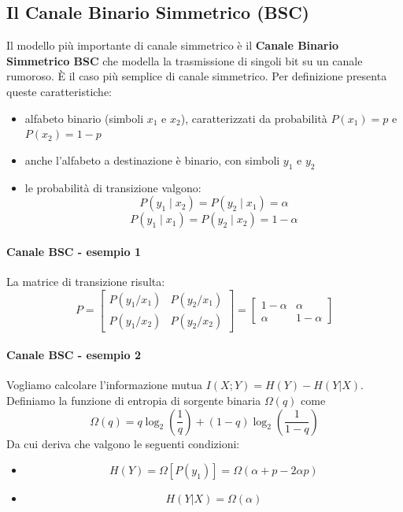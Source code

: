 \subsection{Il Canale Binario Simmetrico (BSC)}
Il modello più importante di canale simmetrico è il \textbf{Canale Binario Simmetrico BSC} che modella la trasmissione di singoli bit su un canale rumoroso. È il caso più semplice di canale simmetrico.
Per definizione presenta queste caratteristiche:
\begin{itemize}
    \item alfabeto binario (simboli $x_1$ e $x_2$), caratterizzati da probabilità $P(x_1)= p$ e $P(x_2)= 1-p$
    \item anche l'alfabeto a destinazione è binario, con simboli $y_1$ e $y_2$
    \item le probabilità di transizione valgono:
    \[P(y_1\mid x_2) = P(y_2 \mid x_1) = \alpha\]
    \[P(y_1\mid x_1) = P(y_2 \mid x_2) = 1- \alpha\]
\end{itemize}

\paragraph{Canale BSC - esempio 1}
%


La matrice di transizione risulta:
\[
P = \begin{bmatrix}
P(y_1/x_1) & P(y_2/x_1) \\
P(y_1/x_2) & P(y_2/x_2)
\end{bmatrix} =
\begin{bmatrix}
1-\alpha & \alpha \\
\alpha & 1-\alpha
\end{bmatrix}
\]


\paragraph{Canale BSC - esempio 2}
Vogliamo calcolare l'informazione mutua $I(X;Y) = H(Y) - H(Y|X)$.
Definiamo la funzione di entropia di sorgente binaria $\Omega(q)$ come
\[\Omega(q) = q\log_2\left(\frac{1}{q}\right) + (1 - q) \log_2 \left(\frac{1}{1-q}\right)\]
Da cui deriva che valgono le seguenti condizioni:
\begin{itemize}
    \item \[H(Y) = \Omega\left[P(y_1)\right] = \Omega(\alpha + p - 2\alpha p) \]
    \item \[H(Y|X)= \Omega(\alpha)\]
\end{itemize}


